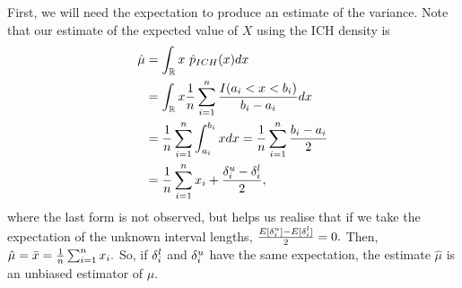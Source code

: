 First, we will need the expectation to produce an estimate of the variance. Note that our estimate of the expected value of $X$ using the ICH density is
\begin{align}
\hat\mu &= \int_{\mathbb{R}} x ~ \hat{p}_{ICH}(x) dx \\
&= \int_{\mathbb{R}} x \frac{1}{n}\sum_{i=1}^n \frac{I(a_i < x < b_i)}{b_i - a_i} dx \\
&= \frac{1}{n}\sum_{i=1}^n  \int_{a_i}^{b_i} x dx
= \frac{1}{n}\sum_{i=1}^n \frac{b_i - a_i}{2} \\
&= \frac{1}{n}\sum_{i=1}^n x_i + \frac{{\delta^u_i} - {\delta^l_i}}{2},
\end{align}
where the last form is not observed, but helps us realise that if we take the expectation of the unknown interval lengths, $\frac{E[{\delta^u_i}] - E[{\delta^l_i}]}{2} = 0.$ Then, $\hat\mu = \bar{x} = \frac{1}{n}\sum_{i=1}^n x_i.$ So, if ${\delta^l_i}$ and ${\delta^u_i}$ have the same expectation, the estimate $\hat\mu$ is an unbiased estimator of $\mu$.

